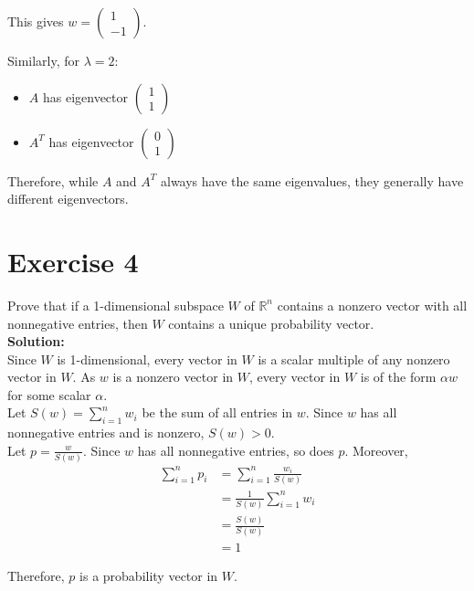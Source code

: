 \documentclass{article}
\begin{document}
\begin{itemize}
This gives $w = \begin{pmatrix} 1 \\ -1 \end{pmatrix}$.

Similarly, for $\lambda = 2$:
\begin{itemize}
    \item $A$ has eigenvector $\begin{pmatrix} 1 \\ 1 \end{pmatrix}$
    \item $A^T$ has eigenvector $\begin{pmatrix} 0 \\ 1 \end{pmatrix}$
\end{itemize}

Therefore, while $A$ and $A^T$ always have the same eigenvalues, they generally have different eigenvectors.
\end{itemize}
\newpage

\section*{Exercise 4}
Prove that if a 1-dimensional subspace $W$ of $\mathbb{R}^n$ contains a nonzero vector with all nonnegative entries, then $W$ contains a unique probability vector. \\

\textbf{Solution:} \\

Since $W$ is 1-dimensional, every vector in $W$ is a scalar multiple of any nonzero vector in $W$. As $w$ is a nonzero vector in $W$, every vector in $W$ is of the form $\alpha w$ for some scalar $\alpha$. \\

Let $S(w) = \sum_{i=1}^n w_i$ be the sum of all entries in $w$. Since $w$ has all nonnegative entries and is nonzero, $S(w) > 0$. \\

Let $p = \frac{w}{S(w)}$. Since $w$ has all nonnegative entries, so does $p$. Moreover,
\begin{align*}
\sum_{i=1}^n p_i &= \sum_{i=1}^n \frac{w_i}{S(w)} \\
&= \frac{1}{S(w)} \sum_{i=1}^n w_i \\
&= \frac{S(w)}{S(w)} \\
&= 1
\end{align*}

Therefore, $p$ is a probability vector in $W$. \\
\end{document}
